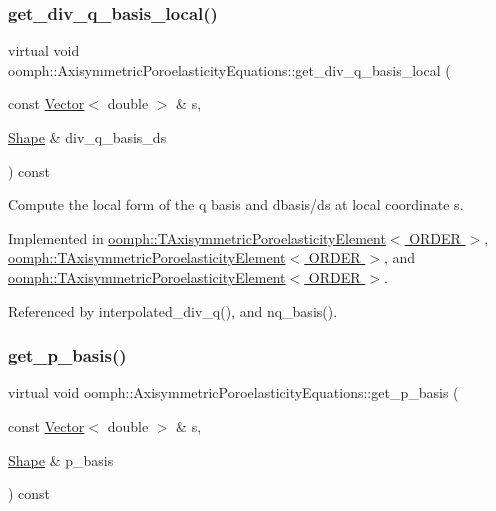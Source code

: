 \subsubsection{\texorpdfstring{get\+\_\+div\+\_\+q\+\_\+basis\+\_\+local()}{get\_div\_q\_basis\_local()}}
{\footnotesize\ttfamily virtual void oomph\+::\+Axisymmetric\+Poroelasticity\+Equations\+::get\+\_\+div\+\_\+q\+\_\+basis\+\_\+local (\begin{DoxyParamCaption}\item[{const \hyperlink{classoomph_1_1Vector}{Vector}$<$ double $>$ \&}]{s,  }\item[{\hyperlink{classoomph_1_1Shape}{Shape} \&}]{div\+\_\+q\+\_\+basis\+\_\+ds }\end{DoxyParamCaption}) const\hspace{0.3cm}{\ttfamily [pure virtual]}}



Compute the local form of the q basis and dbasis/ds at local coordinate s. 



Implemented in \hyperlink{classoomph_1_1TAxisymmetricPoroelasticityElement_a9d5dc0246e71dce2e217a45754d05472}{oomph\+::\+T\+Axisymmetric\+Poroelasticity\+Element$<$ O\+R\+D\+E\+R $>$}, \hyperlink{classoomph_1_1TAxisymmetricPoroelasticityElement_af452f0a776720636babc94bf1205f5ca}{oomph\+::\+T\+Axisymmetric\+Poroelasticity\+Element$<$ O\+R\+D\+E\+R $>$}, and \hyperlink{classoomph_1_1TAxisymmetricPoroelasticityElement_a8099e78155f0a3a042b57e35756847e1}{oomph\+::\+T\+Axisymmetric\+Poroelasticity\+Element$<$ O\+R\+D\+E\+R $>$}.



Referenced by interpolated\+\_\+div\+\_\+q(), and nq\+\_\+basis().

\mbox{\label{classoomph_1_1AxisymmetricPoroelasticityEquations_ae3a7d5fd68eb6c68770d7783013bda19}} 
\subsubsection{\texorpdfstring{get\+\_\+p\+\_\+basis()}{get\_p\_basis()}}
{\footnotesize\ttfamily virtual void oomph\+::\+Axisymmetric\+Poroelasticity\+Equations\+::get\+\_\+p\+\_\+basis (\begin{DoxyParamCaption}\item[{const \hyperlink{classoomph_1_1Vector}{Vector}$<$ double $>$ \&}]{s,  }\item[{\hyperlink{classoomph_1_1Shape}{Shape} \&}]{p\+\_\+basis }\end{DoxyParamCaption}) const\hspace{0.3cm}{\ttfamily [pure virtual]}}



